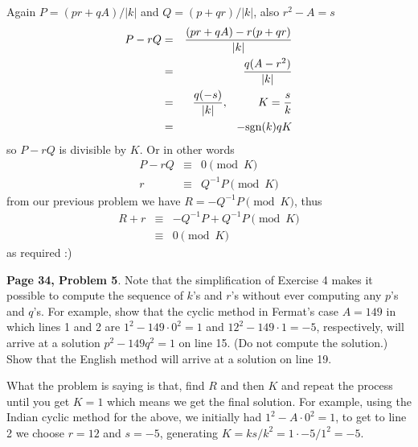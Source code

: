 \documentclass[aps,preprint,preprintnumbers,nofootinbib,showpacs,prd]{revtex4-1}
\newcommand{\nbea}{\begin{eqnarray*}}
\newcommand{\neea}{\end{eqnarray*}}
\begin{document}
Again $P = (pr + qA)/|k|$ and $Q = (p + qr)/|k|$, also $r^2 - A = s$
%
\nbea
P - rQ & = & \frac{(pr + qA) - r(p + qr)}{|k|} \\
& = & \frac{q(A-r^2)}{|k|} \\
& = & \frac{q(-s)}{|k|}, ~~~~~~~~ K = \frac{s}{k} \\
& = & -{\rm sgn}(k) qK
\neea
%
so $P- rQ$ is divisible by $K$. Or in other words
%
\nbea
P - rQ & \equiv & 0 \pmod{K} \\
r & \equiv & Q^{-1}P \pmod{K}
\neea
%
from our previous problem we have $R = -Q^{-1}P \pmod{K}$, thus
%
\nbea
R + r & \equiv & -Q^{-1}P + Q^{-1}P \pmod{K} \\
& \equiv & 0 \pmod{K}
\neea
%
as required :)

{\bf Page 34, Problem 5}. Note that the simplification of Exercise 4 makes it possible to compute the sequence of $k$'s and $r$'s without ever computing any $p$'s and $q$'s. For example, show that the cyclic method in Fermat's case $A = 149$ in which lines 1 and 2 are $1^2 - 149\cdot0^2 = 1$ and $12^2 - 149\cdot 1 = -5$, respectively, will arrive at a solution $p^2 - 149q^2 = 1$ on line 15. (Do not compute the solution.) Show that the English method will arrive at a solution on line 19.

What the problem is saying is that, find $R$ and then $K$ and repeat the process until you get $K=1$ which means we get the final solution. For example, using the Indian cyclic method for the above, we initially had $1^2 - A\cdot0^2 = 1$, to get to line 2 we choose $r = 12$ and $s = -5$, generating $K = ks/k^2 = 1\cdot-5/1^2 = -5$.
\end{document}
